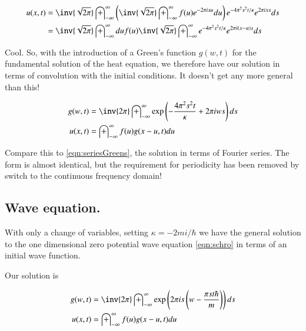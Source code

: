 \documentclass{article}
\newcommand{\IIinf}[0]{ \int_{-\infty}^\infty }
\begin{document}
\begin{align*}
u(x,t) 
&= \inv{\sqrt{2\pi}} \IIinf \left( \inv{\sqrt{2\pi}} \IIinf f(u) e^{-2 \pi i s u } du \right) e^{ -4 \pi^2 s^2 t/ \kappa } e^{2 \pi i x s } ds  \\
&= \inv{\sqrt{2\pi}} \IIinf du f(u) \inv{\sqrt{2\pi}} \IIinf e^{ -4 \pi^2 s^2 t/ \kappa } e^{2 \pi i (x - u) s } ds  \\
\end{align*}

Cool.  So, with the introduction of a Green's function $g(w,t)$ for the fundamental solution of the heat equation, we therefore have
our solution in terms of convolution with the initial conditions.  It doesn't get any more general than this!

\begin{align}
g(w,t) &= \inv{{2\pi}} \IIinf \exp\left( -\frac{4 \pi^2 s^2 t}{\kappa} + 2 \pi i w s \right) ds \\
u(x,t) &= \IIinf f(u) g( x - u, t) du
\end{align}

Compare this to \ref{eqn:seriesGreens}, the solution in terms of Fourier series.  The form is almost identical, but the requirement for periodicity has been removed by switch to the continuous frequency domain!

\subsection{ Wave equation. }

With only a change of variables, setting $\kappa = - 2 m i /\hbar$ we have the general solution to the one dimensional zero potential wave equation 
\ref{eqn:schro}
in terms of an initial wave function.

Our solution is 

\begin{align}
g(w,t) &= \inv{{2\pi}} \IIinf \exp\left( 2 \pi i s \left(w -\frac{\pi s t \hbar}{m} \right)\right) ds \\
u(x,t) &= \IIinf f(u) g( x - u, t) du
\end{align}

%
%
\end{document}
